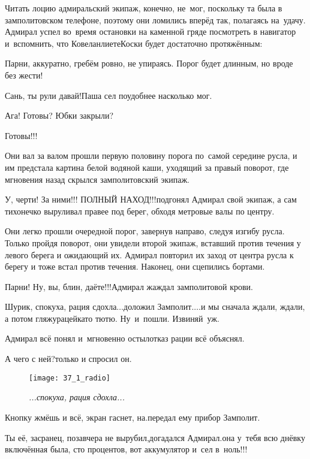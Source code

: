 Читать лоцию адмиральский экипаж, конечно, не~мог, поскольку та была в замполитовском телефоне, поэтому они ломились вперёд так, полагаясь на~удачу. Адмирал успел во~время остановки на каменной гряде посмотреть в навигатор и~вспомнить, что Ковеланлиете\sdash Коски будет достаточно протяжённым:

\diagdash Парни, аккуратно, гребём ровно, не упираясь. Порог будет длинным, но вроде без жести!

\diagdash Сань, ты рули давай!\mdash Паша сел поудобнее насколько мог.

\diagdash Ага! Готовы? Юбки закрыли?

\diagdash Готовы!!!

Они вал за валом прошли первую половину порога по~самой середине русла, и им предстала картина белой водяной каши, уходящий за правый поворот, где мгновения назад скрылся замполитовский экипаж.

\diagdash У, черти! За ними!!! {\large ПОЛНЫЙ НАХОД!!!}\mdash подгонял Адмирал свой экипаж, а сам тихонечко выруливал правее под берег, обходя метровые валы по центру. 

Они легко прошли очередной порог, завернув направо, следуя изгибу русла. Только пройдя поворот, они увидели второй экипаж, вставший против течения у левого берега и ожидающий их. Адмирал повторил их заход от центра русла к берегу и тоже встал против течения. Наконец, они сцепились бортами.

\diagdash Парни! Ну, вы, блин, даёте!!!\mdash Адмирал жаждал замполитовой крови.

\diagdash Шурик, спокуха, рация сдохла$\ldots$\mdash доложил Замполит.\mdash$\ldots$и мы сначала ждали, ждали, а потом гляжу\mdash рацейка\sdash то тю\sdash тю. Ну~и~пошли. Извиняй~уж.

Адмирал всё понял и~мгновенно остыл\mdash отказ рации всё объяснял.

\diagdash А чего с ней?\mdash только и спросил он.

\begin{wrapfigure}[12]{r}{0.48\textwidth}
	\centering
	\texttt{[image: 37\_1\_radio]}
	\caption{\small\textit{...спокуха, рация сдохла...}}
\end{wrapfigure}

\diagdash Кнопку жмёшь и всё, экран гаснет, на.\mdash передал ему прибор Замполит.

\diagdash Ты её, засранец, позавчера не вырубил,\mdash догадался Адмирал.\mdash она у~тебя всю днёвку включённая была, сто процентов, вот аккумулятор и~сел в~ноль!!!

